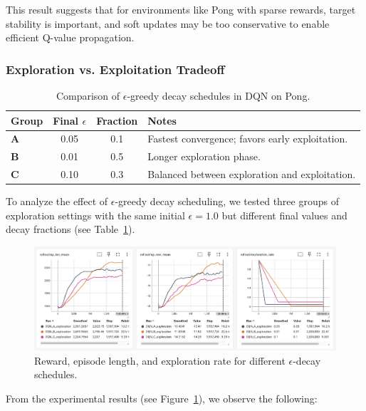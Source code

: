 \documentclass[10pt,twocolumn,letterpaper]{article}
\begin{document}
This result suggests that for environments like Pong with sparse rewards, target stability is important, and soft updates may be too conservative to enable efficient Q-value propagation.

\subsubsection{Exploration vs. Exploitation Tradeoff}

\begin{table}
  \centering
  \begin{tabular}{@{}lcc>{\raggedright\arraybackslash}p{4.1cm}@{}}
    \toprule
    Group & Final $\epsilon$ & Fraction & Notes \\
    \midrule
    \textbf{A} & 0.05 & 0.1 & Fastest convergence; favors early exploitation. \\
    \textbf{B} & 0.01 & 0.5 & Longer exploration phase. \\
    \textbf{C} & 0.10 & 0.3 & Balanced between exploration and exploitation. \\
    \bottomrule
  \end{tabular}
  \caption{Comparison of $\epsilon$-greedy decay schedules in DQN on Pong.}
  \label{tab:dqn_exploration}
\end{table}


To analyze the effect of $\epsilon$-greedy decay scheduling, we tested three groups of exploration settings with the same initial $\epsilon=1.0$ but different final values and decay fractions (see Table~\ref{tab:dqn_exploration}).

\begin{figure}[h]
  \centering
  \includegraphics[width=\linewidth]{assets/4.4/Epsilon_Comparison.png}
  \caption{Reward, episode length, and exploration rate for different $\epsilon$-decay schedules.}
  \label{fig:epsilon_result}
\end{figure}

\noindent
From the experimental results (see Figure~\ref{fig:epsilon_result}), we observe the following:
\end{document}
